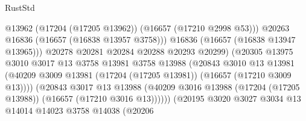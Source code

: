 \begin{lexlean}{RustStd}
\begin{coremodule}
                                              @13962
                                              (@17204 (@17205 @13962))
                                              (@16657 (@17210 @2998 @53)))
                                            @20263
                                            @16836
                                            (@16657 (@16838 @13957 @3758)))
                                          @16836
                                          (@16657 (@16838 @13947 @13965)))
                                        @20278
                                        @20281
                                        @20284
                                        @20288
                                        @20293
                                        @20299)
                                      (@20305
                                        @13975
                                        @3010
                                        @3017
                                        @13
                                        @3758
                                        @13981
                                        @3758
                                        @13988
                                        (@20843
                                          @3010
                                          @13
                                          @13981
                                          (@40209
                                            @3009
                                            @13981
                                            (@17204 (@17205 @13981))
                                            (@16657 (@17210 @3009 @13))))
                                        (@20843
                                          @3017
                                          @13
                                          @13988
                                          (@40209
                                            @3016
                                            @13988
                                            (@17204 (@17205 @13988))
                                            (@16657 (@17210 @3016 @13))))))
                                    (@20195
                                      @3020
                                      @3027
                                      @3034
                                      @13
                                      @14014
                                      @14023
                                      @3758
                                      @14038
                                      (@20206

\end{coremodule}
\end{lexlean}
